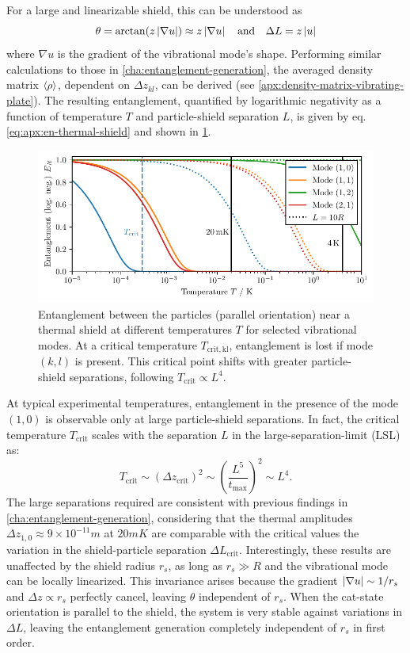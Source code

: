 For a large and linearizable shield, this can be understood as
\begin{equation}
  \theta = \arctan(z \left\lvert\nabla u\right\rvert) \approx z \left\lvert\nabla u\right\rvert \quad \text{and} \quad \Delta L = z \left\lvert u\right\rvert
\end{equation}
where $\nabla u$ is the gradient of the vibrational mode's shape.
Performing similar calculations to those in \cref{cha:entanglement-generation}, the averaged density matrix $\left\langle\rho\right\rangle$, dependent on $\Delta z_{kl}$, can be derived (see \cref{apx:density-matrix-vibrating-plate}).
The resulting entanglement, quantified by logarithmic negativity as a function of temperature $T$ and particle-shield separation $L$, is given by eq. \eqref{eq:apx:en-thermal-shield} and shown in \cref{fig:5:entanglement-temperature}.
\begin{figure}[!htbp]
  \centering
  \includegraphics[width=\textwidth]{./../figures/vibrations/log-neg-shield-vibrations-T.pdf}
  \caption{Entanglement between the particles (parallel orientation) near a thermal shield at different temperatures $T$ for selected vibrational modes. At a critical temperature $T_\mathrm{crit,kl}$, entanglement is lost if mode $(k, l)$ is present. This critical point shifts with greater particle-shield separations, following $T_\mathrm{crit} \propto L^4$.}
  \label{fig:5:entanglement-temperature}
\end{figure}
At typical experimental temperatures, entanglement in the presence of the mode $(1,0)$ is observable only at large particle-shield separations.
In fact, the critical temperature $T_\mathrm{crit}$ scales with the separation $L$ in the large-separation-limit (LSL) as:
\begin{equation}
  T_\mathrm{crit} \sim (\Delta z_\mathrm{crit})^2 \sim \left(\frac{L^5}{t_\mathrm{max}} \right)^2 \sim L^4 .
\end{equation}
The large separations required are consistent with previous findings in \cref{cha:entanglement-generation}, considering that the thermal amplitudes $\Delta z_{1,0} \approx 9 \times 10^{-11}\si{m}$ at $20\si{mK}$ are comparable with the critical values the variation in the shield-particle separation $\Delta L_\mathrm{crit}$.
Interestingly, these results are unaffected by the shield radius $r_s$, as long as $r_s \gg R$ and the vibrational mode can be locally linearized.
This invariance arises because the gradient $\left\lvert\nabla u\right\rvert \sim 1/r_s$ and $\Delta z \propto r_s$ perfectly cancel, leaving $\theta$ independent of $r_s$. 
When the cat-state orientation is parallel to the shield, the system is very stable against variations in $\Delta L$, leaving the entanglement generation completely independent of $r_s$ in first order.

